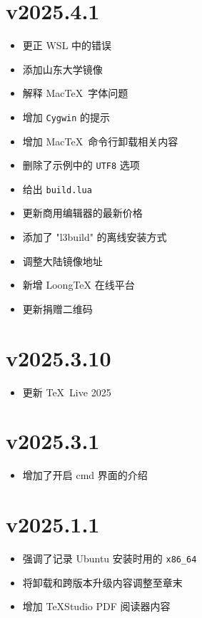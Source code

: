 \section*{v2025.4.1}

\begin{itemize}
  \item 更正 WSL 中的错误
  \item 添加山东大学镜像
  \item 解释 Mac\TeX\ 字体问题
  \item 增加 \texttt{Cygwin} 的提示
  \item 增加 Mac\TeX\ 命令行卸载相关内容
  \item 删除了示例中的 \texttt{UTF8} 选项
  \item 给出 \texttt{build.lua}
  \item 更新商用编辑器的最新价格
  \item 添加了 "l3build" 的离线安装方式
  \item 调整大陆镜像地址
  \item 新增 LoongTeX 在线平台
  \item 更新捐赠二维码
\end{itemize}

\section*{v2025.3.10}

\begin{itemize}
  \item 更新 \TeX~Live 2025
\end{itemize}

\section*{v2025.3.1}

\begin{itemize}
  \item 增加了开启 \textsf{cmd} 界面的介绍
\end{itemize}

\section*{v2025.1.1}

\begin{itemize}
  \item 强调了记录 Ubuntu 安装时用的 \texttt{x86\_64}
  \item 将卸载和跨版本升级内容调整至章末
  \item 增加 \TeX Studio PDF 阅读器内容
\end{itemize}

